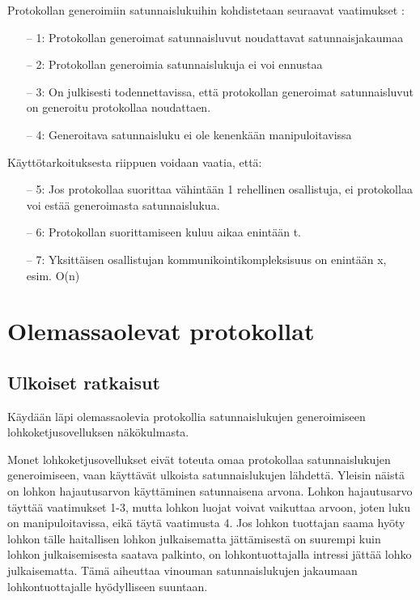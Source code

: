 \documentclass{article}
\begin{document}
Protokollan generoimiin satunnaislukuihin kohdistetaan seuraavat vaatimukset \cite{simic_review_2020}:
\begin{itemize}
    \item[--] 1: Protokollan generoimat satunnaisluvut noudattavat satunnaisjakaumaa
    \item[--] 2: Protokollan generoimia satunnaislukuja ei voi ennustaa
    \item[--] 3: On julkisesti todennettavissa, että protokollan generoimat satunnaisluvut on generoitu protokollaa noudattaen.
    \item[--] 4: Generoitava satunnaisluku ei ole kenenkään manipuloitavissa
\end{itemize}\textbf{}
Käyttötarkoituksesta riippuen voidaan vaatia, että:

\begin{itemize}
    \item[--] 5: Jos protokollaa suorittaa vähintään 1 rehellinen osallistuja, ei protokollaa voi estää generoimasta satunnaislukua.
    \item[--] 6: Protokollan suorittamiseen kuluu aikaa enintään t.
    \item[--] 7: Yksittäisen osallistujan kommunikointikompleksisuus on enintään x, esim. O(n)
\end{itemize}

\section{Olemassaolevat protokollat}

\subsection{Ulkoiset ratkaisut}
Käydään läpi olemassaolevia protokollia satunnaislukujen generoimiseen lohkoketjusovelluksen näkökulmasta. 

Monet lohkoketjusovellukset eivät toteuta omaa protokollaa satunnaislukujen generoimiseen, vaan käyttävät ulkoista satunnaislukujen lähdettä. Yleisin näistä on lohkon hajautusarvon käyttäminen satunnaisena arvona. Lohkon hajautusarvo täyttää vaatimukset 1-3, mutta lohkon luojat voivat vaikuttaa arvoon, joten luku on manipuloitavissa, eikä täytä vaatimusta 4. Jos lohkon tuottajan saama hyöty lohkon tälle haitallisen lohkon julkaisematta jättämisestä on suurempi kuin lohkon julkaisemisesta saatava palkinto, on lohkontuottajalla intressi jättää lohko julkaisematta. Tämä aiheuttaa vinouman satunnaislukujen jakaumaan lohkontuottajalle hyödylliseen suuntaan.
\end{document}
